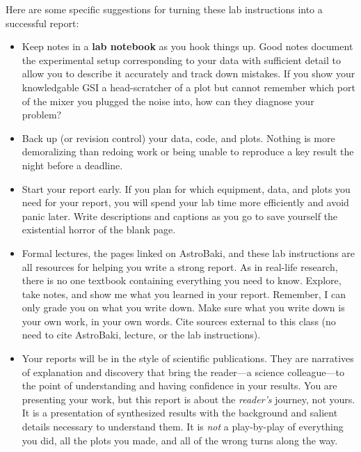 \documentclass[11pt,preprint]{aastex}
\begin{document}
Here are some specific suggestions for turning these lab instructions into a successful report:
\begin{itemize}

\item Keep notes in a {\bf lab notebook} as you hook things up.
Good notes document the experimental setup corresponding to your data with sufficient
detail to allow you to describe it accurately and track down mistakes.
If you show your knowledgable GSI a head-scratcher of a plot but cannot remember
which port of the mixer you plugged the noise into, how can they diagnose your problem?

\item Back up (or revision control) your data, code, and plots. Nothing is more demoralizing than redoing work
or being unable to reproduce a key result the night before a deadline.

\item Start your report early. If you plan for which equipment, data, and plots you need
for your report, you will spend your lab time more efficiently and avoid 
panic later. Write descriptions and captions as you go to
save yourself the existential horror of the blank page.

\item Formal lectures, the pages linked on AstroBaki, and these lab instructions are 
all resources for helping you write a strong report. As in real-life research, there
is no one textbook containing everything you need to know. Explore, take notes, and show
me what you learned in your report. Remember, I can only grade you on what you write down.
Make sure what you write down is your own work, in your own words. Cite sources
external to this class (no need to cite AstroBaki, lecture, or the lab instructions).

\item Your reports will be in the style of scientific publications. They are narratives of explanation and discovery 
that bring the reader---a science colleague---to the point of understanding and having confidence in your results.
You are presenting your work, but this report is about the {\it reader's} journey, not yours.
It is a presentation of synthesized results with the background and salient details necessary to understand them. 
It is {\it not} a play-by-play of everything you did, all the plots you made, and all of the wrong turns along the way.

\end{itemize}
\end{document}
